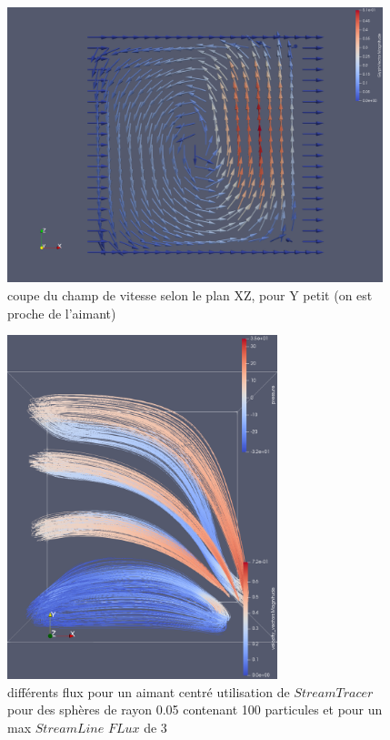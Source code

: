 \documentclass[a4paper,12pt,titlepage]{report}
\begin{document}
\begin{onehalfspace}
\begin{figure}[!h]
\begin{center} 
\includegraphics[height = 8cm, keepaspectratio]{graphes/Paraview/coupe_aimant_decentre.png} 
\caption{\label{figure 35}coupe du champ de vitesse selon le plan XZ, pour Y petit (on est proche de l'aimant)}
\end{center}
\end{figure}


\begin{figure}[!h]
\begin{center} 
\includegraphics[height = 10cm, keepaspectratio]{graphes/Paraview/differents_flux_decentre_100pt_lenght4_rad05.png} 
\caption{\label{figure 36 }  différents flux pour un aimant centré utilisation de $StreamTracer$pour des sphères de rayon 0.05 contenant 100 particules et pour un max $StreamLine$ $FLux$ de 3}
\end{center}
\end{figure}


\end{onehalfspace}
\end{document}
